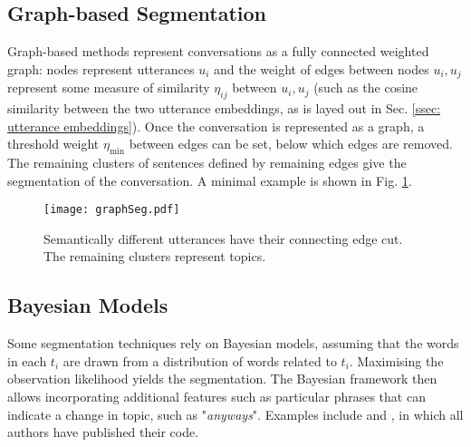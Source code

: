     
    \subsection{Graph-based Segmentation} 
    Graph-based methods represent conversations as a fully connected weighted graph: nodes represent utterances $u_i$ and the weight of edges between nodes $u_i, u_j$ represent some measure of similarity $\eta_{ij}$ between $u_i, u_j$ (such as the cosine similarity between the two utterance embeddings, as is layed out in Sec. \ref{ssec: utterance embeddings}). Once the conversation is represented as a graph, a threshold weight $\eta_{\text{min}}$ between edges can be set, below which edges are removed. The remaining clusters of sentences defined by remaining edges give the segmentation of the conversation.\cite{malioutov2006minimum} A minimal example is shown in Fig. \ref{fig: graph seg}.
    
    \begin{figure}[h]
    \centering
    \texttt{[image: graphSeg.pdf]}
    \caption{Semantically different utterances have their connecting edge cut. The remaining clusters represent topics.\label{fig: graph seg}}
    \end{figure}

    \subsection{Bayesian Models}
    Some segmentation techniques rely on Bayesian models, assuming that the words in each $t_i$ are drawn from a distribution of words related to $t_i$. Maximising the observation likelihood yields the segmentation\cite{eisenstein2008bayesian}. The Bayesian framework then allows incorporating additional features such as particular phrases that can indicate a change in topic, such as "\textit{anyways}". Examples include \cite{purver2006unsupervised}\cite{eisenstein2008bayesian} and \cite{nguyen2012sits}, in which all authors have published their code.